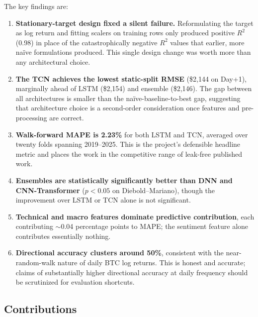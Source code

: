 \documentclass[12pt]{article}
\begin{document}
The key findings are:
\begin{enumerate}[leftmargin=*]
    \item \textbf{Stationary-target design fixed a silent failure.} Reformulating the target as log return and fitting scalers on training rows only produced positive $R^2$ (0.98) in place of the catastrophically negative $R^2$ values that earlier, more na\"ive formulations produced. This single design change was worth more than any architectural choice.
    \item \textbf{The TCN achieves the lowest static-split RMSE} (\$2{,}144 on Day+1), marginally ahead of LSTM (\$2{,}154) and ensemble (\$2{,}146). The gap between all architectures is smaller than the na\"ive-baseline-to-best gap, suggesting that architecture choice is a second-order consideration once features and pre-processing are correct.
    \item \textbf{Walk-forward MAPE is 2.23\%} for both LSTM and TCN, averaged over twenty folds spanning 2019--2025. This is the project's defensible headline metric and places the work in the competitive range of leak-free published work.
    \item \textbf{Ensembles are statistically significantly better than DNN and CNN-Transformer} ($p<0.05$ on Diebold--Mariano), though the improvement over LSTM or TCN alone is not significant.
    \item \textbf{Technical and macro features dominate predictive contribution}, each contributing $\sim$0.04 percentage points to MAPE; the sentiment feature alone contributes essentially nothing.
    \item \textbf{Directional accuracy clusters around 50\%}, consistent with the near-random-walk nature of daily BTC log returns. This is honest and accurate; claims of substantially higher directional accuracy at daily frequency should be scrutinized for evaluation shortcuts.
\end{enumerate}

\subsection{Contributions}
\end{document}
